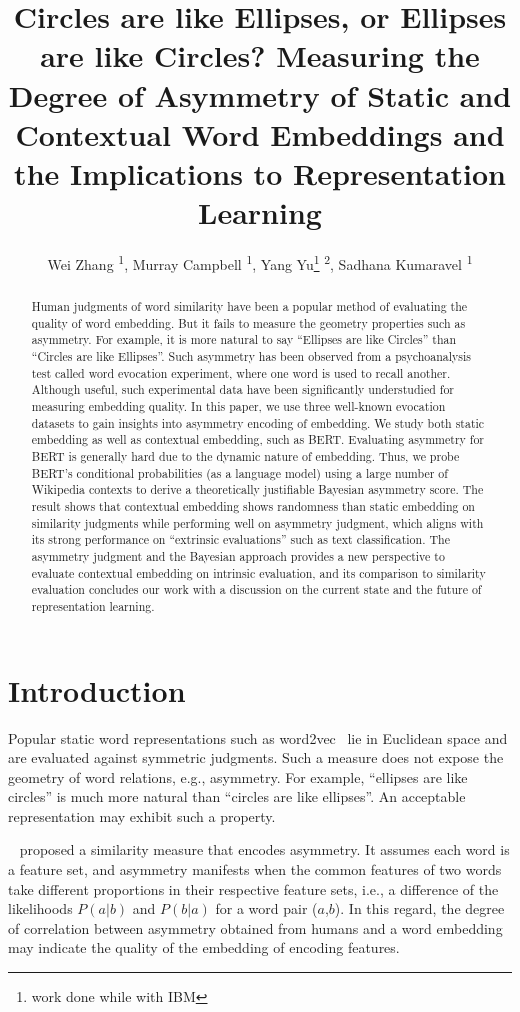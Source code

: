 \documentclass[letterpaper]{article} %
\title{Circles are like Ellipses, or Ellipses are like Circles? Measuring the Degree of Asymmetry of Static and Contextual Word Embeddings and the Implications to Representation Learning}
\author {
    Wei Zhang \textsuperscript{\rm 1},
    Murray Campbell \textsuperscript{\rm 1},
    Yang Yu\footnote{work done while with IBM} \textsuperscript{\rm 2},
    Sadhana Kumaravel \textsuperscript{\rm 1}
    \\
}
\begin{document}
\maketitle

\begin{abstract}
Human judgments of word similarity have been a popular method of evaluating the quality of word embedding. But it fails to measure the geometry properties such as asymmetry. For example, it is more natural to say ``Ellipses are like Circles'' than ``Circles are like Ellipses''. Such asymmetry has been observed from a psychoanalysis test called word evocation experiment, where one word is used to recall another. Although useful, such experimental data have been significantly understudied for measuring embedding quality. In this paper, we use three well-known evocation datasets to gain insights into asymmetry encoding of embedding. We study both static embedding as well as contextual embedding, such as BERT. Evaluating asymmetry for BERT is generally hard due to the dynamic nature of embedding. Thus, we probe BERT's conditional probabilities (as a language model) using a large number of Wikipedia contexts to derive a theoretically justifiable Bayesian asymmetry score. The result shows that contextual embedding shows randomness than static embedding on similarity judgments while performing well on asymmetry judgment, which aligns with its strong performance on ``extrinsic evaluations'' such as text classification. The asymmetry judgment and the Bayesian approach provides a new perspective to evaluate contextual embedding on intrinsic evaluation, and its comparison to similarity evaluation concludes our work with a discussion on the current state and the future of representation learning.
\end{abstract}

\section{Introduction}
Popular static word representations such as word2vec~\citep{mikolov2013distributed} lie in Euclidean space and are evaluated against symmetric judgments. Such a measure does not expose the geometry of word relations, e.g., asymmetry. For example, ``ellipses are like circles'' is much more natural than ``circles are like ellipses''. An acceptable representation may exhibit such a property.

~\citet{tversky1977features} proposed a similarity measure that encodes asymmetry.
It assumes each word is a feature set, and asymmetry manifests when the common features of two words take different proportions in their respective feature sets, i.e., a difference of the likelihoods $P(a|b)$ and $P(b|a)$ for a word pair ($a$,$b$). In this regard, the degree of correlation between asymmetry obtained from humans and a word embedding may indicate the quality of the embedding of encoding features.
\end{document}
